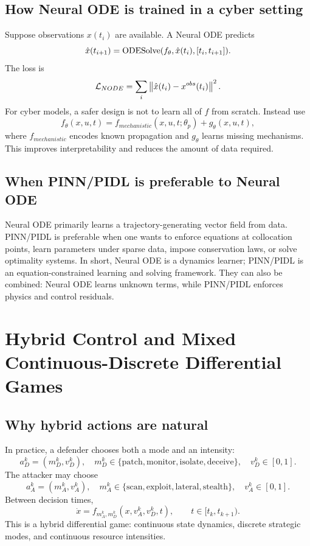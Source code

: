 \documentclass[11pt,a4paper]{article}
\begin{document}
\subsection{How Neural ODE is trained in a cyber setting}
Suppose observations $x(t_i)$ are available. A Neural ODE predicts
\begin{equation}
\hat{x}(t_{i+1})=\operatorname{ODESolve}(f_\theta,\hat{x}(t_i),[t_i,t_{i+1}]).
\end{equation}
The loss is
\begin{equation}
\mathcal{L}_{NODE}=\sum_i\left\lVert \hat{x}(t_i)-x^{obs}(t_i) \right\rVert^2.
\end{equation}
For cyber models, a safer design is not to learn all of $f$ from scratch. Instead use
\begin{equation}
f_\theta(x,u,t)=f_{mechanistic}(x,u,t;\theta_p)+g_\theta(x,u,t),
\end{equation}
where $f_{mechanistic}$ encodes known propagation and $g_\theta$ learns missing mechanisms. This improves interpretability and reduces the amount of data required.

\subsection{When PINN/PIDL is preferable to Neural ODE}
Neural ODE primarily learns a trajectory-generating vector field from data. PINN/PIDL is preferable when one wants to enforce equations at collocation points, learn parameters under sparse data, impose conservation laws, or solve optimality systems. In short, Neural ODE is a dynamics learner; PINN/PIDL is an equation-constrained learning and solving framework. They can also be combined: Neural ODE learns unknown terms, while PINN/PIDL enforces physics and control residuals.

\section{Hybrid Control and Mixed Continuous-Discrete Differential Games}
\subsection{Why hybrid actions are natural}
In practice, a defender chooses both a mode and an intensity:
\begin{equation}
a_D^k=(m_D^k,v_D^k),\quad m_D^k\in\{\text{patch},\text{monitor},\text{isolate},\text{deceive}\},\quad v_D^k\in[0,1].
\end{equation}
The attacker may choose
\begin{equation}
a_A^k=(m_A^k,v_A^k),\quad m_A^k\in\{\text{scan},\text{exploit},\text{lateral},\text{stealth}\},\quad v_A^k\in[0,1].
\end{equation}
Between decision times,
\begin{equation}
\dot{x}=f_{m_A^k,m_D^k}(x,v_A^k,v_D^k,t),\qquad t\in[t_k,t_{k+1}).
\end{equation}
This is a hybrid differential game: continuous state dynamics, discrete strategic modes, and continuous resource intensities.
\end{document}
